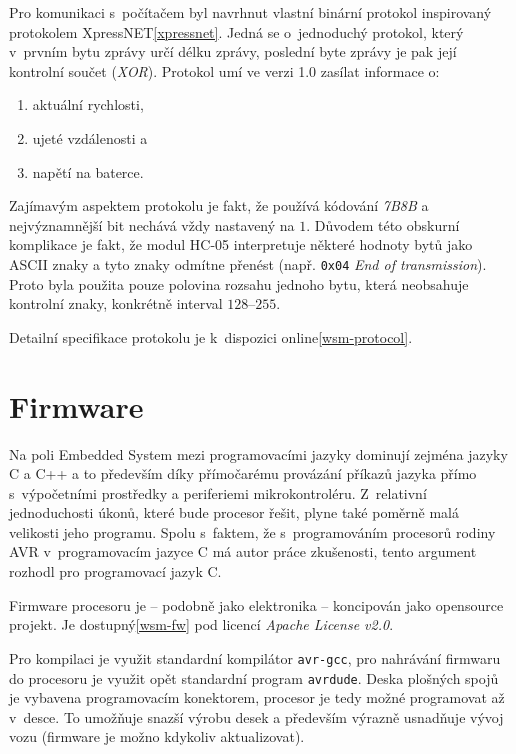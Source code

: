 Pro komunikaci s~počítačem byl navrhnut vlastní binární protokol inspirovaný
protokolem XpressNET\ref{xpressnet}. Jedná se o~jednoduchý protokol, který
v~prvním bytu zprávy určí délku zprávy, poslední byte zprávy je pak její
kontrolní součet (\textit{XOR}). Protokol umí ve verzi 1.0 zasílat informace o:

\begin{enumerate}
\item aktuální rychlosti,
\item ujeté vzdálenosti a
\item napětí na baterce.
\end{enumerate}

Zajímavým aspektem protokolu je fakt, že používá kódování \textit{7B8B} a
nejvýznamnější bit nechává vždy nastavený na $1$. Důvodem této obskurní
komplikace je fakt, že modul HC-05 interpretuje některé hodnoty bytů jako
ASCII znaky a tyto znaky odmítne přenést (např. \texttt{0x04} \textit{End
of transmission}). Proto byla použita pouze polovina rozsahu jednoho
bytu, která neobsahuje kontrolní znaky, konkrétně interval $128$--$255$.

Detailní specifikace protokolu je k~dispozici online\ref{wsm-protocol}.

\section{Firmware}
\label{sec:wsm-fw}

Na poli Embedded System mezi programovacími jazyky dominují zejména jazyky
C a C++ a to především díky přímočarému provázání příkazů jazyka přímo
s~výpočetními prostředky a periferiemi mikrokontroléru. Z~relativní jednoduchosti
úkonů, které bude procesor řešit, plyne také poměrně malá velikosti jeho
programu. Spolu s~faktem, že s~programováním procesorů rodiny AVR
v~programovacím jazyce C má autor práce zkušenosti, tento argument rozhodl pro
programovací jazyk C.

Firmware procesoru je -- podobně jako elektronika -- koncipován jako opensource
projekt. Je dostupný\ref{wsm-fw} pod licencí \textit{Apache License v2.0}.

Pro kompilaci je využit standardní kompilátor \texttt{avr-gcc}, pro nahrávání
firmwaru do procesoru je využit opět standardní program \texttt{avrdude}. Deska
plošných spojů je vybavena programovacím konektorem, procesor je tedy možné
programovat až v~desce. To umožňuje snazší výrobu desek a především výrazně
usnadňuje vývoj vozu (firmware je možno kdykoliv aktualizovat).

